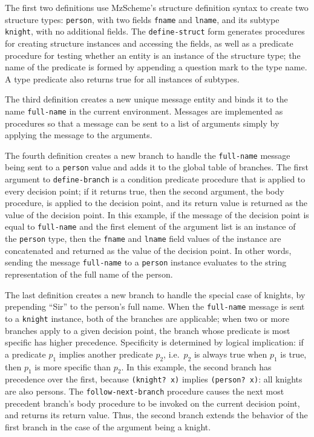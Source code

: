 \documentclass{acm_proc_article-sp}
\newcommand{\code}[1]{\texttt{#1}}
\begin{document}
The first two definitions use MzScheme's structure definition syntax to
create two structure types: \code{person}, with two fields \code{fname} and
\code{lname}, and its subtype \code{knight}, with no additional fields.
The \code{define-struct} form generates procedures for creating
structure instances and accessing the fields, as well as a predicate
procedure for testing whether an entity is an instance of the
structure type; the name of the predicate is formed by appending a
question mark to the type name.  A type predicate also returns true
for all instances of subtypes.

The third definition creates a new unique message entity and binds it
to the name \code{full-name} in the current environment.  Messages are
implemented as procedures so that a message can be sent to a list of
arguments simply by applying the message to the arguments.

The fourth definition creates a new branch to handle the
\code{full-name} message being sent to a \code{person} value and adds
it to the global table of branches.  The first argument to
\code{define-branch} is a condition predicate procedure that is
applied to every decision point; if it returns true, then the second
argument, the body procedure, is applied to the decision point, and
its return value is returned as the value of the decision point.  In
this example, if the message of the decision point is equal to
\code{full-name} and the first element of the argument list is an
instance of the \code{person} type, then the \code{fname} and
\code{lname} field values of the instance are concatenated and
returned as the value of the decision point.  In other words, sending
the message \code{full-name} to a \code{person} instance evaluates to
the string representation of the full name of the person.

The last definition creates a new branch to handle the special case of
knights, by prepending ``Sir'' to the person's full name.  When the
\code{full-name} message is sent to a \code{knight} instance, both of
the branches are applicable; when two or more branches apply to a
given decision point, the branch whose predicate is most specific has
higher precedence.  Specificity is determined by logical implication:
if a predicate $p_1$ implies another predicate $p_2$, i.e.~$p_2$ is
always true when $p_1$ is true, then $p_1$ is more specific than
$p_2$.  In this example, the second branch has precedence over the
first, because \code{(knight?\ x)} implies \code{(person?\ x)}: all
knights are also persons.  The \code{follow-next-branch} procedure
causes the next most precedent branch's body procedure to be invoked
on the current decision point, and returns its return value.  Thus,
the second branch extends the behavior of the first branch in the case
of the argument being a knight.
\end{document}

